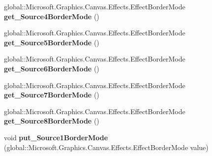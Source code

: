 \begin{DoxyCompactItemize}
\item 
\mbox{\label{interface_microsoft_1_1_graphics_1_1_canvas_1_1_effects_1_1_i_pixel_shader_effect_a91d09add6bac573e43153e209d73cbef}} 
global\+::\+Microsoft.\+Graphics.\+Canvas.\+Effects.\+Effect\+Border\+Mode {\bfseries get\+\_\+\+Source4\+Border\+Mode} ()
\item 
\mbox{\label{interface_microsoft_1_1_graphics_1_1_canvas_1_1_effects_1_1_i_pixel_shader_effect_a669a10ea05efae927941f15a62c557e7}} 
global\+::\+Microsoft.\+Graphics.\+Canvas.\+Effects.\+Effect\+Border\+Mode {\bfseries get\+\_\+\+Source5\+Border\+Mode} ()
\item 
\mbox{\label{interface_microsoft_1_1_graphics_1_1_canvas_1_1_effects_1_1_i_pixel_shader_effect_a0507c83fcc52e89819c1cd829f51f5cf}} 
global\+::\+Microsoft.\+Graphics.\+Canvas.\+Effects.\+Effect\+Border\+Mode {\bfseries get\+\_\+\+Source6\+Border\+Mode} ()
\item 
\mbox{\label{interface_microsoft_1_1_graphics_1_1_canvas_1_1_effects_1_1_i_pixel_shader_effect_a3165c2648d955cc38095edef814d9605}} 
global\+::\+Microsoft.\+Graphics.\+Canvas.\+Effects.\+Effect\+Border\+Mode {\bfseries get\+\_\+\+Source7\+Border\+Mode} ()
\item 
\mbox{\label{interface_microsoft_1_1_graphics_1_1_canvas_1_1_effects_1_1_i_pixel_shader_effect_ab3bfcba24bdb9d608b1c47f812b2889b}} 
global\+::\+Microsoft.\+Graphics.\+Canvas.\+Effects.\+Effect\+Border\+Mode {\bfseries get\+\_\+\+Source8\+Border\+Mode} ()
\item 
\mbox{\label{interface_microsoft_1_1_graphics_1_1_canvas_1_1_effects_1_1_i_pixel_shader_effect_a54587f9cd5533d826d5cde79e9d8b15b}} 
void {\bfseries put\+\_\+\+Source1\+Border\+Mode} (global\+::\+Microsoft.\+Graphics.\+Canvas.\+Effects.\+Effect\+Border\+Mode value)
\item 

\end{DoxyCompactItemize}
